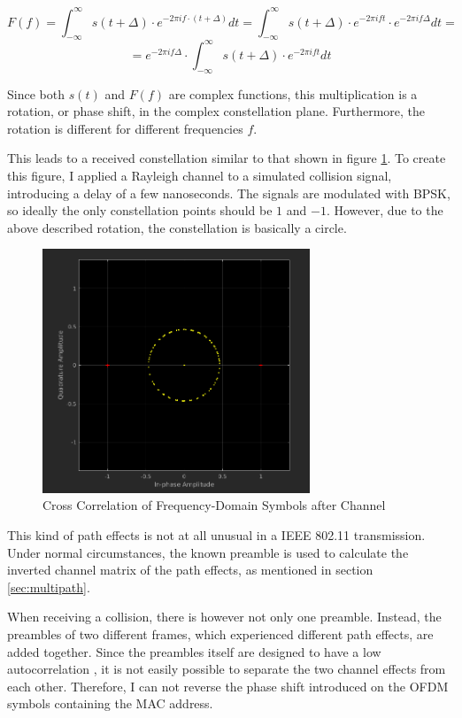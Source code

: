 $$ F(f) = \int_{-\infty}^{\infty} s(t + \Delta) \cdot e^{-2 \pi i f \cdot (t + \Delta)} dt = \int_{-\infty}^{\infty} s(t + \Delta) \cdot e^{-2 \pi i f t} \cdot e^{-2 \pi i f \Delta} dt = $$
$$ = e^{-2 \pi i f \Delta} \cdot \int_{-\infty}^{\infty} s(t + \Delta) \cdot e^{-2 \pi i f t} dt $$

Since both $ s(t) $ and $ F(f) $ are complex functions, this multiplication is a rotation, or phase shift, in the complex constellation plane. Furthermore, the rotation is different for different frequencies $ f $.

This leads to a received constellation similar to that shown in figure \ref{fig:freqd-corr}. To create this figure, I applied a Rayleigh channel \cite{NEEDED} to a simulated collision signal, introducing a delay of a few nanoseconds. The signals are modulated with BPSK, so ideally the only constellation points should be $ 1 $ and $ -1 $. However, due to the above described rotation, the constellation is basically a circle.

\begin{figure}[ht]
	\centering
	\includegraphics[width=8cm]{gfx/images/freqd-correlation}
	\caption{Cross Correlation of Frequency-Domain Symbols after Channel}
	\label{fig:freqd-corr}
\end{figure}

This kind of path effects is not at all unusual in a IEEE 802.11 transmission. Under normal circumstances, the known preamble is used to calculate the inverted channel matrix of the path effects, as mentioned in section \ref{sec:multipath}.

When receiving a collision, there is however not only one preamble. Instead, the preambles of two different frames, which experienced different path effects, are added together. Since the preambles itself are designed to have a low autocorrelation \cite{NEEDED}, it is not easily possible to separate the two channel effects from each other. Therefore, I can not reverse the phase shift introduced on the OFDM symbols containing the MAC address.


